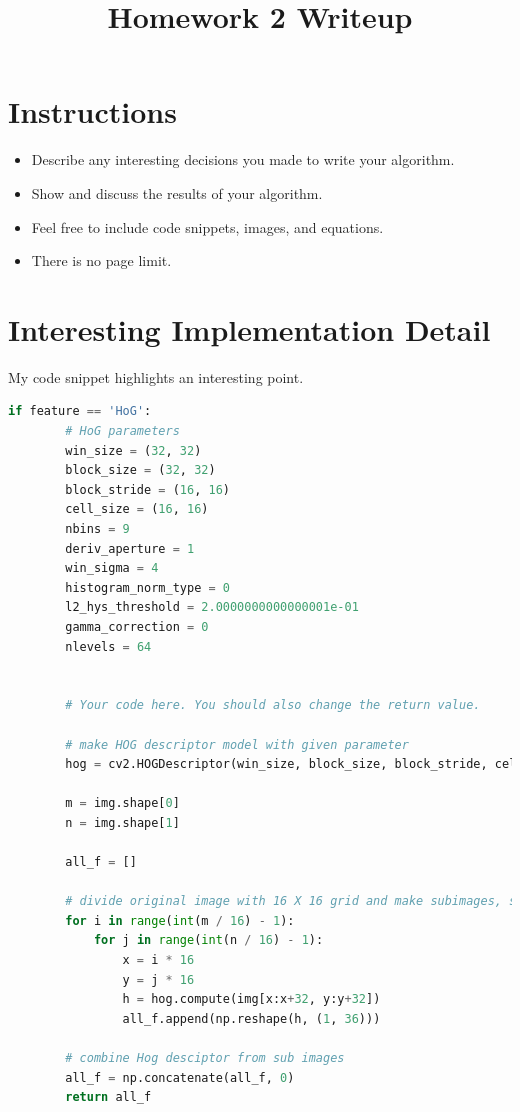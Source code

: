 \title{\vspace{-1cm}Homework 2 Writeup}



\maketitle
\vspace{-3cm}
\thispagestyle{fancy}

\section*{Instructions}
\begin{itemize}
  \item Describe any interesting decisions you made to write your algorithm.
  \item Show and discuss the results of your algorithm.
  \item Feel free to include code snippets, images, and equations.
  \item There is no page limit.

\end{itemize}


\section*{Interesting Implementation Detail}


My code snippet highlights an interesting point.


\lstset{numbers = left, numbersep=5pt, breaklines=true}
\begin{lstlisting}[language=python, caption = {HOG Feature extraction}]
    if feature == 'HoG':
        # HoG parameters
        win_size = (32, 32)
        block_size = (32, 32)
        block_stride = (16, 16)
        cell_size = (16, 16)
        nbins = 9
        deriv_aperture = 1
        win_sigma = 4
        histogram_norm_type = 0
        l2_hys_threshold = 2.0000000000000001e-01
        gamma_correction = 0
        nlevels = 64


        # Your code here. You should also change the return value.

        # make HOG descriptor model with given parameter
        hog = cv2.HOGDescriptor(win_size, block_size, block_stride, cell_size, nbins, deriv_aperture, win_sigma, histogram_norm_type, l2_hys_threshold, gamma_correction, nlevels)

        m = img.shape[0]
        n = img.shape[1]

        all_f = []

        # divide original image with 16 X 16 grid and make subimages, so find HoG descriptor by grouped 4 cell (32 X 32) and 16 X 16 stride
        for i in range(int(m / 16) - 1):
            for j in range(int(n / 16) - 1):
                x = i * 16
                y = j * 16
                h = hog.compute(img[x:x+32, y:y+32])
                all_f.append(np.reshape(h, (1, 36)))

        # combine Hog desciptor from sub images
        all_f = np.concatenate(all_f, 0)
        return all_f
\end{lstlisting}

